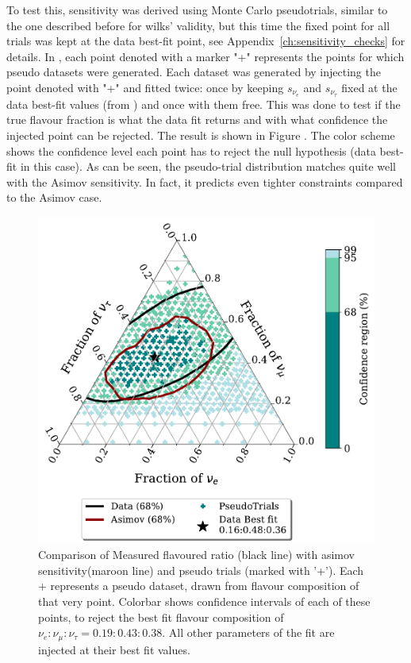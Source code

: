 To test this, sensitivity was derived using Monte Carlo pseudotrials, similar to the one described before for wilks' validity, but this time the fixed point for all trials was kept at the data best-fit point, see Appendix~\ref{ch:sensitivity_checks} for details. In , each point denoted with a marker "+" represents the points for which pseudo datasets were generated. Each dataset was generated by injecting the point denoted with "+" and fitted twice: once by keeping $s_{\nu_{e}}$ and $s_{\nu_{\tau}}$ fixed at the data best-fit values (from ) and once with them free. This was done to test if the true flavour fraction is what the data fit returns and with what confidence the injected point can be rejected. The result is shown in Figure . The color scheme shows the confidence level each point has to reject the null hypothesis (data best-fit in this case). As can be seen, the pseudo-trial distribution matches quite well with the Asimov sensitivity. In fact, it predicts even tighter constraints compared to the Asimov case.

\begin{figure}[h]
    
    \includegraphics{./figures/results/PE_data_asimov_68.pdf}


    \caption{Comparison of Measured flavoured ratio (black line) with asimov sensitivity(maroon line) and pseudo trials (marked with '+'). Each + represents a pseudo dataset, drawn from flavour composition of that very point. Colorbar shows confidence intervals of each of these points, to reject the best fit flavour composition of $\nu_e:\nu_{\mu}:\nu_{\tau} = 0.19:0.43:0.38$. All other parameters of the fit are injected at their best fit values.}
\end{figure}

